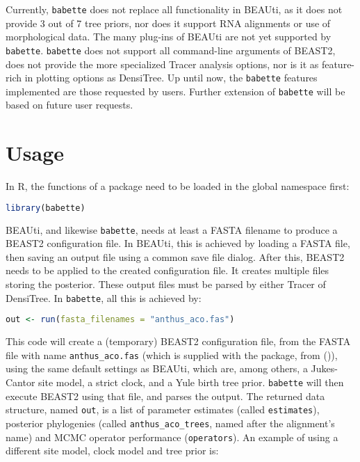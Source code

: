 \documentclass{article}
\begin{document}
Currently, \verb;babette; does not replace all functionality in BEAUti,
as it does not provide 3 out of 7 tree priors, nor does it support RNA
alignments or use of morphological data. The many plug-ins of BEAUti
are not yet supported by \verb;babette;. \verb;babette; does not support
all command-line arguments of BEAST2, does not provide
the more specialized Tracer analysis options, nor is it as feature-rich
in plotting options as DensiTree. Up until now, the \verb;babette; features 
implemented are those requested by users. Further extension of \verb;babette; 
will be based on future user requests.

\section{Usage}

In R, the functions of a package need to be loaded in the global namespace first:

\begin{lstlisting}[language=R, floatplacement=H]
library(babette)
\end{lstlisting}
BEAUti, and likewise \verb;babette;, needs at least a FASTA filename
to produce a BEAST2 configuration file. 
In BEAUti, this is achieved by loading a FASTA file, 
then saving an output file using a common
save file dialog. After this, BEAST2 needs to be applied to
the created configuration file. It creates multiple files
storing the posterior. These output
files must be parsed by either Tracer of DensiTree.
In \verb;babette;, all this is achieved by:

\begin{lstlisting}[language=R, floatplacement=H]
out <- run(fasta_filenames = "anthus_aco.fas")
\end{lstlisting}
This code will create a (temporary) BEAST2 configuration file,
from the FASTA file with name \verb;anthus_aco.fas; (which
is supplied with the package, from (\cite{VanEls2018})), 
using the same default settings as BEAUti, which are, 
among others, a Jukes-Cantor site model, a strict clock, and a Yule birth tree prior.
\verb;babette; will then execute BEAST2 using that file, and
parses the output. The returned data structure, named \verb;out;, 
is a list of parameter estimates (called \verb;estimates;), posterior 
phylogenies (called \verb;anthus_aco_trees;, named after
the alignment's name) and MCMC operator performance (\verb;operators;).
An example of using a different site model, clock model 
and tree prior is:
\end{document}
